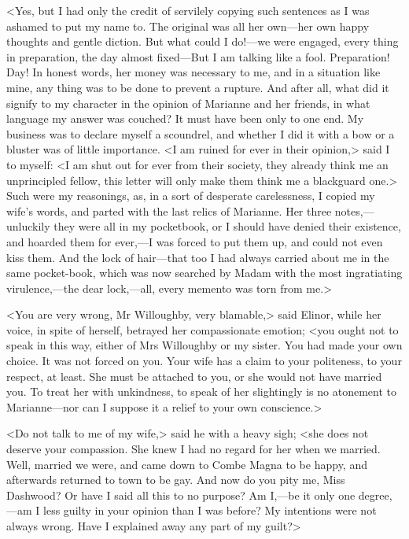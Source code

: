 <Yes, but I had only the credit of servilely copying such sentences as I was ashamed to put my name to. The original was all her own—her own happy thoughts and gentle diction. But what could I do!—we were engaged, every thing in preparation, the day almost fixed—But I am talking like a fool. Preparation! Day! In honest words, her money was necessary to me, and in a situation like mine, any thing was to be done to prevent a rupture. And after all, what did it signify to my character in the opinion of Marianne and her friends, in what language my answer was couched? It must have been only to one end. My business was to declare myself a scoundrel, and whether I did it with a bow or a bluster was of little importance. <I am ruined for ever in their opinion,> said I to myself: <I am shut out for ever from their society, they already think me an unprincipled fellow, this letter will only make them think me a blackguard one.> Such were my reasonings, as, in a sort of desperate carelessness, I copied my wife's words, and parted with the last relics of Marianne. Her three notes,—unluckily they were all in my pocketbook, or I should have denied their existence, and hoarded them for ever,—I was forced to put them up, and could not even kiss them. And the lock of hair—that too I had always carried about me in the same pocket-book, which was now searched by Madam with the most ingratiating virulence,—the dear lock,—all, every memento was torn from me.>

<You are very wrong, Mr Willoughby, very blamable,> said Elinor, while her voice, in spite of herself, betrayed her compassionate emotion; <you ought not to speak in this way, either of Mrs Willoughby or my sister. You had made your own choice. It was not forced on you. Your wife has a claim to your politeness, to your respect, at least. She must be attached to you, or she would not have married you. To treat her with unkindness, to speak of her slightingly is no atonement to Marianne—nor can I suppose it a relief to your own conscience.>

<Do not talk to me of my wife,> said he with a heavy sigh; <she does not deserve your compassion. She knew I had no regard for her when we married. Well, married we were, and came down to Combe Magna to be happy, and afterwards returned to town to be gay. And now do you pity me, Miss Dashwood? Or have I said all this to no purpose? Am I,—be it only one degree,—am I less guilty in your opinion than I was before? My intentions were not always wrong. Have I explained away any part of my guilt?>

